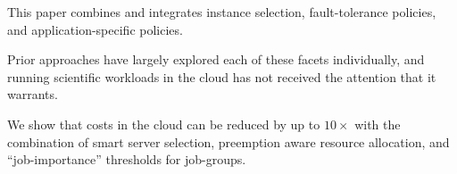 

This paper combines and integrates instance selection, fault-tolerance policies, and application-specific policies.

Prior approaches have largely explored each of these facets individually, and running scientific workloads in the cloud has not received the attention that it warrants.

We show that costs in the cloud can be reduced by up to $10\times$ with the combination of smart server selection, preemption aware resource allocation, and ``job-importance'' thresholds for job-groups.



